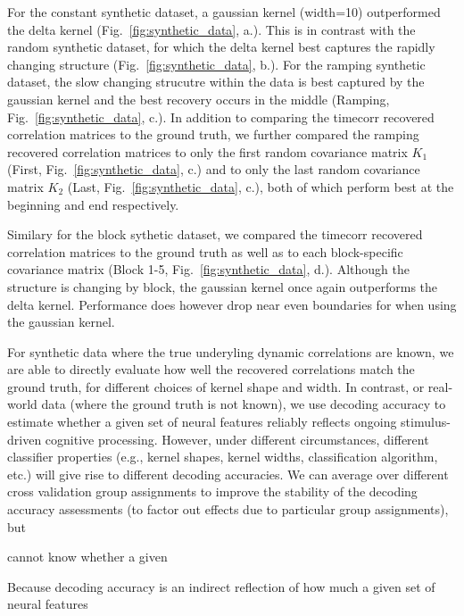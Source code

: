 For the constant synthetic dataset, a gaussian kernel (width=10)
outperformed the delta kernel (Fig.~\ref{fig:synthetic_data},  a.).  This is in contrast with the random
synthetic dataset, for which the delta kernel best captures the
rapidly changing structure (Fig.~\ref{fig:synthetic_data},  b.). For
the ramping synthetic dataset, the slow changing strucutre within the
data is best
captured by the gaussian kernel and the best recovery occurs in the
middle (Ramping, Fig.~\ref{fig:synthetic_data},
c.). In addition to comparing the timecorr recovered correlation
matrices to the ground truth, we
further compared the ramping recovered correlation matrices to only the first random covariance matrix $K_{1}$
(First, Fig.~\ref{fig:synthetic_data},  c.) and to only the last
random covariance matrix $K_{2}$ (Last, Fig.~\ref{fig:synthetic_data},
c.), both of which perform best at the beginning and end respectively.

Similary for the block sythetic dataset, we compared the timecorr
recovered correlation matrices to the ground truth as well as to each
block-specific covariance matrix (Block 1-5,
Fig.~\ref{fig:synthetic_data},  d.).  Although the structure is
changing by block, the gaussian kernel once again outperforms the
delta kernel.  Performance does however drop near even boundaries for
when using the gaussian kernel.









For synthetic data where the true underyling dynamic correlations are
known, we are able to directly evaluate how well the recovered
correlations match the ground truth, for different choices of kernel
shape and width.  In contrast, or real-world data (where the ground
truth is not known), we use decoding accuracy to estimate whether a
given set of neural features reliably reflects ongoing stimulus-driven
cognitive processing.  However, under different circumstances,
different classifier properties (e.g., kernel shapes, kernel widths,
classification algorithm, etc.) will give rise to different decoding
accuracies.  We can average over different cross validation group
assignments to improve the stability of the decoding accuracy
assessments (to factor out effects due to particular group
assignments), but 

cannot know whether a given 


Because decoding accuracy is an indirect
reflection of how much a given set of neural features 

